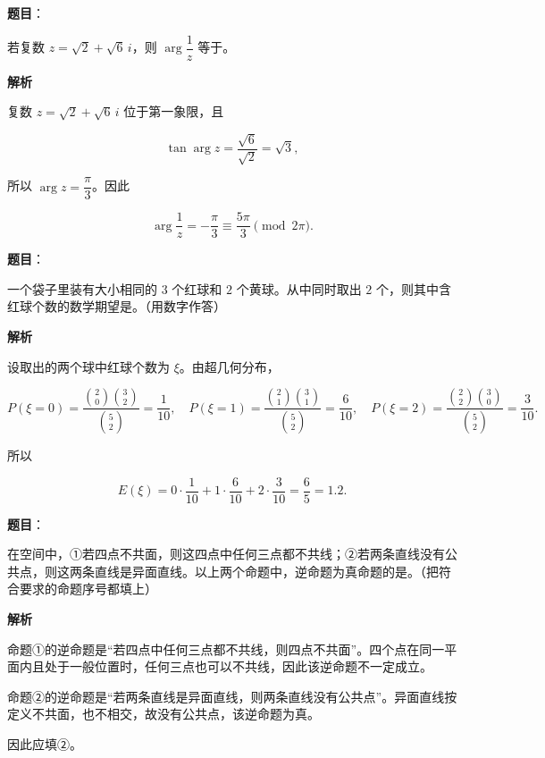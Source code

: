 \begin{answer}

\textbf{题目}：

若复数 $z=\sqrt2+\sqrt6\,i$，则 $\arg\dfrac1z$ 等于\gkblank{}。

\textbf{解析}

复数 $z=\sqrt2+\sqrt6\,i$ 位于第一象限，且

\nopagebreak[4]
\[
\tan\arg z=\frac{\sqrt6}{\sqrt2}=\sqrt3,
\]

所以 $\arg z=\dfrac\pi3$。因此

\nopagebreak[4]
\[
\arg\frac1z=-\frac\pi3\equiv\frac{5\pi}{3}\pmod{2\pi}.
\]


\end{answer}
\begin{answer}

\textbf{题目}：

一个袋子里装有大小相同的 $3$ 个红球和 $2$ 个黄球。从中同时取出 $2$ 个，则其中含红球个数的数学期望是\gkblank{}。（用数字作答）

\textbf{解析}

设取出的两个球中红球个数为 $\xi$。由超几何分布，

\nopagebreak[4]
\[
P(\xi=0)=\frac{\binom20\binom32}{\binom52}=\frac1{10},\quad
P(\xi=1)=\frac{\binom21\binom31}{\binom52}=\frac6{10},\quad
P(\xi=2)=\frac{\binom22\binom30}{\binom52}=\frac3{10}.
\]

所以

\nopagebreak[4]
\[
E(\xi)=0\cdot\frac1{10}+1\cdot\frac6{10}+2\cdot\frac3{10}
=\frac65=1.2.
\]


\end{answer}
\begin{answer}

\textbf{题目}：

在空间中，①若四点不共面，则这四点中任何三点都不共线；②若两条直线没有公共点，则这两条直线是异面直线。以上两个命题中，逆命题为真命题的是\gkblank{}。（把符合要求的命题序号都填上）

\textbf{解析}

命题①的逆命题是“若四点中任何三点都不共线，则四点不共面”。四个点在同一平面内且处于一般位置时，任何三点也可以不共线，因此该逆命题不一定成立。

命题②的逆命题是“若两条直线是异面直线，则两条直线没有公共点”。异面直线按定义不共面，也不相交，故没有公共点，该逆命题为真。

因此应填②。


\end{answer}
